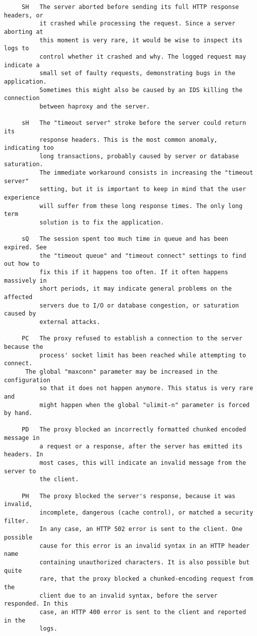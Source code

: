 \begin{verbatim}
     SH   The server aborted before sending its full HTTP response headers, or
          it crashed while processing the request. Since a server aborting at
          this moment is very rare, it would be wise to inspect its logs to
          control whether it crashed and why. The logged request may indicate a
          small set of faulty requests, demonstrating bugs in the application.
          Sometimes this might also be caused by an IDS killing the connection
          between haproxy and the server.

     sH   The "timeout server" stroke before the server could return its
          response headers. This is the most common anomaly, indicating too
          long transactions, probably caused by server or database saturation.
          The immediate workaround consists in increasing the "timeout server"
          setting, but it is important to keep in mind that the user experience
          will suffer from these long response times. The only long term
          solution is to fix the application.

     sQ   The session spent too much time in queue and has been expired. See
          the "timeout queue" and "timeout connect" settings to find out how to
          fix this if it happens too often. If it often happens massively in
          short periods, it may indicate general problems on the affected
          servers due to I/O or database congestion, or saturation caused by
          external attacks.

     PC   The proxy refused to establish a connection to the server because the
          process' socket limit has been reached while attempting to connect.
	  The global "maxconn" parameter may be increased in the configuration
          so that it does not happen anymore. This status is very rare and
          might happen when the global "ulimit-n" parameter is forced by hand.

     PD   The proxy blocked an incorrectly formatted chunked encoded message in
          a request or a response, after the server has emitted its headers. In
          most cases, this will indicate an invalid message from the server to
          the client.

     PH   The proxy blocked the server's response, because it was invalid,
          incomplete, dangerous (cache control), or matched a security filter.
          In any case, an HTTP 502 error is sent to the client. One possible
          cause for this error is an invalid syntax in an HTTP header name
          containing unauthorized characters. It is also possible but quite
          rare, that the proxy blocked a chunked-encoding request from the
          client due to an invalid syntax, before the server responded. In this
          case, an HTTP 400 error is sent to the client and reported in the
          logs.


\end{verbatim}
